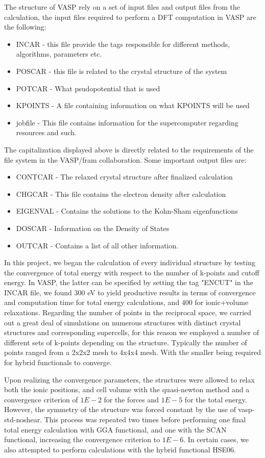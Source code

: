 The structure of VASP rely on a set of input files and output files from the calculation, the input files required to perform a DFT computation in VASP are the following:
\begin{itemize}
    \item INCAR - this file provide the tags responsible for different methods, algorithms, parameters etc.
    \item POSCAR - this file is related to the crystal structure of the system
    \item POTCAR - What psudopotential that is used
    \item KPOINTS - A file containing information on what KPOINTS will be used
    \item jobfile - This file contains information for the supercomputer regarding resources and such.
\end{itemize}
The capitalization displayed above is directly related to the requirements of the file system in the VASP/fram collaboration. Some important output files are:
\begin{itemize}
    \item CONTCAR - The relaxed crystal structure after finalized calculation
    \item CHGCAR - This file contains the electron density after calculation
    \item EIGENVAL - Contains the solutions to the Kohn-Sham eigenfunctions
    \item DOSCAR - Information on the Density of States
    \item OUTCAR - Contains a list of all other information.
\end{itemize}
In this project, we began the calculation of every individual structure by testing the convergence of total energy with respect to the number of k-points and cutoff energy. In VASP, the latter can be specified by setting the tag "ENCUT" in the INCAR file, we found 300 eV to yield productive results in terms of convergence and computation time for total energy calculations, and 400 for ionic+volume relaxations. Regarding the number of points in the reciprocal space, we carried out a great deal of simulations on numerous structures with distinct crystal structures and corresponding supercells, for this reason we employed a number of different sets of k-points depending on the structure. Typically the number of points ranged from a 2x2x2 mesh to 4x4x4 mesh. With the smaller being required for hybrid functionals to converge. 

Upon realizing the convergence parameters, the structures were allowed to relax both the ionic positions, and cell volume with the quasi-newton method and a convergence criterion of $1E-2$ for the forces and $1E-5$ for the total energy. However, the symmetry of the structure was forced constant by the use of vasp-std-noshear. This process was repeated two times before performing one final total energy calculation with GGA functional, and one with the SCAN functional, increasing the convergence criterion to $1E-6$. In certain cases, we also attempted to perform calculations with the hybrid functional HSE06.


